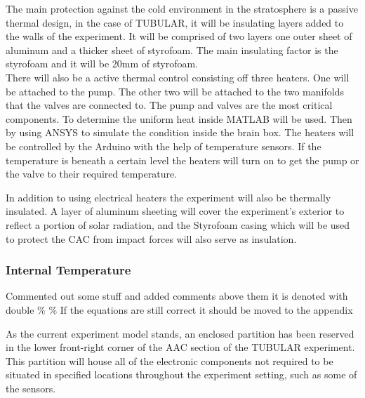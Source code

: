 The main protection against the cold environment in the stratosphere is a passive thermal design, in the case of TUBULAR, it will be insulating layers added to the walls of the experiment. It will be comprised of two layers one outer sheet of aluminum and a thicker sheet of styrofoam. The main insulating factor is the styrofoam and it will be 20mm of styrofoam. \\
There will also be a active thermal control consisting off three heaters. One will be attached to the pump. The other two will be attached to the two manifolds that the valves are connected to. The pump and valves are the most critical components. To determine the uniform heat inside MATLAB will be used. Then by using ANSYS to simulate the condition inside the brain box.
The heaters will be controlled by the Arduino with the help of temperature sensors. If the temperature is beneath a certain level the heaters will turn on to get the pump or the valve to their required temperature.
%

\begin{centering}
In addition to using electrical heaters the experiment will also be thermally insulated. A layer of aluminum sheeting will cover the experiment's exterior to reflect a portion of solar radiation, and the Styrofoam casing which will be used to protect the CAC from impact forces will also serve as insulation. %
\end{centering}



\pagebreak


\raggedbottom

\subsubsection{Internal Temperature}
Commented out some stuff and added comments above them it is denoted with double \% \%
If the equations are still correct it should be moved to the appendix 

As the current experiment model stands, an enclosed partition has been reserved in the lower front-right corner of the AAC section of the TUBULAR experiment. This partition will house all of the electronic components not required to be situated in specified locations throughout the experiment setting, such as some of the sensors. 

